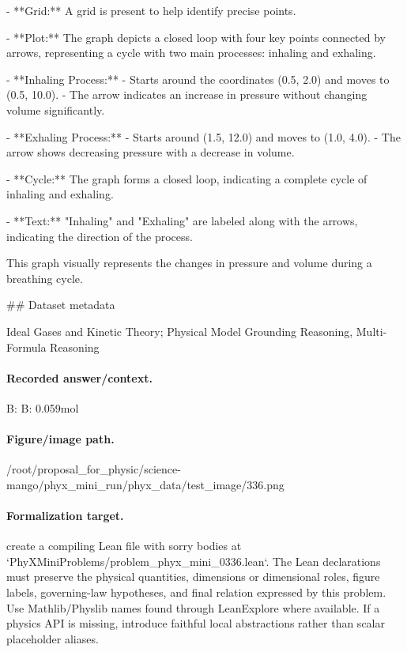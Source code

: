 - **Grid:** A grid is present to help identify precise points.

- **Plot:** The graph depicts a closed loop with four key points connected by arrows, representing a cycle with two main processes: inhaling and exhaling.
  
- **Inhaling Process:**
  - Starts around the coordinates (0.5, 2.0) and moves to (0.5, 10.0).
  - The arrow indicates an increase in pressure without changing volume significantly.

- **Exhaling Process:**
  - Starts around (1.5, 12.0) and moves to (1.0, 4.0).
  - The arrow shows decreasing pressure with a decrease in volume.

- **Cycle:** The graph forms a closed loop, indicating a complete cycle of inhaling and exhaling.

- **Text:** "Inhaling" and "Exhaling" are labeled along with the arrows, indicating the direction of the process.

This graph visually represents the changes in pressure and volume during a breathing cycle.

\#\# Dataset metadata

Ideal Gases and Kinetic Theory; Physical Model Grounding Reasoning, Multi-Formula Reasoning

\paragraph{Recorded answer/context.}
B: B: 0.059mol

\paragraph{Figure/image path.}
/root/proposal\_for\_physic/science-mango/phyx\_mini\_run/phyx\_data/test\_image/336.png

\paragraph{Formalization target.}
create a compiling Lean file with sorry bodies at `PhyXMiniProblems/problem\_phyx\_mini\_0336.lean`. The Lean declarations must preserve the physical quantities, dimensions or dimensional roles, figure labels, governing-law hypotheses, and final relation expressed by this problem.
Use Mathlib/Physlib names found through LeanExplore where available. If a physics API is missing, introduce faithful local abstractions rather than scalar placeholder aliases.

